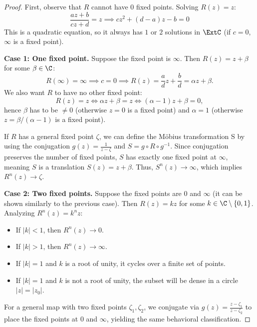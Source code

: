 \begin{proof}
    First, observe that $R$ cannot have $0$ fixed points. Solving $R(z) = z$:
    \[
        \frac{az+b}{cz+d} = z \implies cz^2 + (d-a)z - b = 0
    \]
    This is a quadratic equation, so it always has $1$ or $2$ solutions in
    $\ExtC$ (if $c=0$, $\infty$ is a fixed point). 

    \textbf{Case 1: One fixed point.} Suppose the fixed point is $\infty$. Then
    $R(z) = z + \beta$ for some $\beta \in \C$:
    \[
        R(\infty) = \infty \implies c=0 \implies R(z) = \frac{a}{d}z + \frac{b}{d} = \alpha z + \beta.
    \]
    We also want $R$ to have no other fixed point:
    \[
        R(z) = z \iff \alpha z + \beta = z \iff (\alpha - 1)z + \beta = 0,
    \]
    hence $\beta$ has to be $\neq 0$ (otherwise $z=0$ is a fixed point) and
    $\alpha=1$ (otherwise $z=\beta/(\alpha-1)$ is a fixed point).
    
    If $R$ has a general fixed point $\zeta$, we can define the Möbius
    transformation S by using the conjugation $g(z) = \frac{1}{z-\zeta}$ and $S
    = g \circ R \circ g^{-1}$. Since conjugation preserves the number of fixed
    points, $S$ has exactly one fixed point at $\infty$, meaning $S$ is a
    translation $S(z) = z + \beta$. Thus, $S^n(z) \to \infty$, which implies
    $R^n(z) \to \zeta$.

    \textbf{Case 2: Two fixed points.} Suppose the fixed points are $0$ and
    $\infty$ (it can be shown similarly to the previous case). Then $R(z) = k z$
    for some $k \in \C \setminus \{0, 1\}$. Analyzing $R^n(z) = k^n z$:
    \begin{itemize}
        \item If $|k| < 1$, then $R^n(z) \to 0$.
        \item If $|k| > 1$, then $R^n(z) \to \infty$.
        \item If $|k| = 1$ and $k$ is a root of unity, it cycles over a finite
        set of points.
        \item If $|k| = 1$ and $k$ is not a root of unity, the subset will be
        dense in a circle $|z| = |z_0|$.
    \end{itemize}
    For a general map with two fixed points $\zeta_1, \zeta_2$, we conjugate via
    $g(z) = \frac{z-\zeta_1}{z-\zeta_2}$ to place the fixed points at $0$ and
    $\infty$, yielding the same behavioral classification.
\end{proof}

